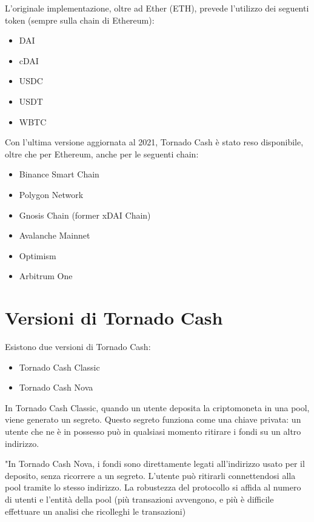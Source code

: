 L'originale implementazione, oltre ad Ether (ETH), prevede l'utilizzo dei seguenti token (sempre sulla chain di Ethereum):

\begin{itemize}
    \item DAI
    \item cDAI
    \item USDC
    \item USDT
    \item WBTC
\end{itemize}

Con l'ultima versione aggiornata al 2021, Tornado Cash è stato reso disponibile, oltre che per Ethereum, anche per le seguenti chain:

\begin{itemize}
    \item Binance Smart Chain
    \item Polygon Network
    \item Gnosis Chain (former xDAI Chain)
    \item Avalanche Mainnet
    \item Optimism
    \item Arbitrum One
\end{itemize}

\section{Versioni di Tornado Cash}

Esistono due versioni di Tornado Cash:

\begin{itemize}
    \item Tornado Cash Classic
    \item Tornado Cash Nova
\end{itemize}

In Tornado Cash Classic, quando un utente deposita la criptomoneta in una pool, viene generato un segreto. Questo segreto funziona come una chiave privata: un utente che ne è in possesso può in qualsiasi momento ritirare i fondi su un altro indirizzo.

"In Tornado Cash Nova, i fondi sono direttamente legati all'indirizzo usato per il deposito, senza ricorrere a un segreto. L'utente può ritirarli connettendosi alla pool tramite lo stesso indirizzo. La robustezza del protocollo si affida al numero di utenti e l'entità della pool (più transazioni avvengono, e più è difficile effettuare un analisi che ricolleghi le transazioni)